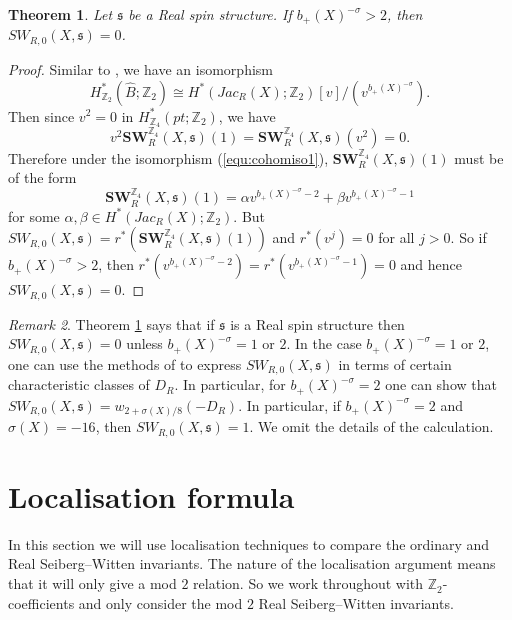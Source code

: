 \documentclass{amsart}
\newtheorem{theorem}{Theorem}[section]
\theoremstyle{definition}
\theoremstyle{remark}
\newtheorem{remark}[theorem]{Remark}
\numberwithin{equation}{section}
\begin{document}
\begin{theorem}\label{thm:spinvanish}
Let $\mathfrak{s}$ be a Real spin structure. If $b_+(X)^{-\sigma} > 2$, then $SW_{R,0}(X,\mathfrak{s}) = 0$.
\end{theorem}
\begin{proof}
Similar to \cite[Proposition 3.1]{bar1}, we have an isomorphism
\begin{equation}\label{equ:cohomiso1}
H^*_{\mathbb{Z}_2}( \widehat{B} ; \mathbb{Z}_2) \cong H^*( Jac_R(X) ; \mathbb{Z}_2)[v]/( v^{b_+(X)^{-\sigma}} ).
\end{equation}
Then since $v^2 = 0$ in $H^*_{\mathbb{Z}_4}(pt ; \mathbb{Z}_2)$, we have
\[
v^2 \mathbf{SW}^{\mathbb{Z}_4}_R(X , \mathfrak{s})(1) = \mathbf{SW}^{\mathbb{Z}_4}_R(X , \mathfrak{s})(v^2) = 0.
\]
Therefore under the isomorphism (\ref{equ:cohomiso1}), $\mathbf{SW}^{\mathbb{Z}_4}_R(X,\mathfrak{s})(1)$ must be of the form 
\[
\mathbf{SW}^{\mathbb{Z}_4}_R(X,\mathfrak{s})(1) = \alpha v^{b_+(X)^{-\sigma}-2} + \beta v^{b_+(X)^{-\sigma}-1}
\]
for some $\alpha,\beta \in H^*( Jac_R(X) ; \mathbb{Z}_2)$. But $SW_{R,0}(X,\mathfrak{s}) = r^*( \mathbf{SW}^{\mathbb{Z}_4}_R(X , \mathfrak{s})(1) )$ and $r^*(v^j ) = 0$ for all $j > 0$. So if $b_+(X)^{-\sigma} > 2$, then $r^*( v^{b_+(X)^{-\sigma}-2} ) = r^*(v^{b_+(X)^{-\sigma}-1}) = 0$ and hence $SW_{R,0}(X,\mathfrak{s}) = 0$.
\end{proof}

\begin{remark}
Theorem \ref{thm:spinvanish} says that if $\mathfrak{s}$ is a Real spin structure then $SW_{R,0}(X,\mathfrak{s}) = 0$ unless $b_+(X)^{-\sigma} = 1$ or $2$. In the case $b_+(X)^{-\sigma} = 1$ or $2$, one can use the methods of \cite{bar1} to express $SW_{R,0}(X,\mathfrak{s})$ in terms of certain characteristic classes of $D_R$. In particular, for $b_+(X)^{-\sigma} = 2$ one can show that $SW_{R,0}(X,\mathfrak{s}) = w_{2 + \sigma(X)/8}(-D_R)$. In particular, if $b_+(X)^{-\sigma} = 2$ and $\sigma(X) = -16$, then $SW_{R,0}(X,\mathfrak{s}) = 1$. We omit the details of the calculation.
\end{remark}


\section{Localisation formula}\label{sec:loc}

In this section we will use localisation techniques to compare the ordinary and Real Seiberg--Witten invariants. The nature of the localisation argument means that it will only give a mod $2$ relation. So we work throughout with $\mathbb{Z}_2$-coefficients and only consider the mod $2$ Real Seiberg--Witten invariants.
\end{document}

